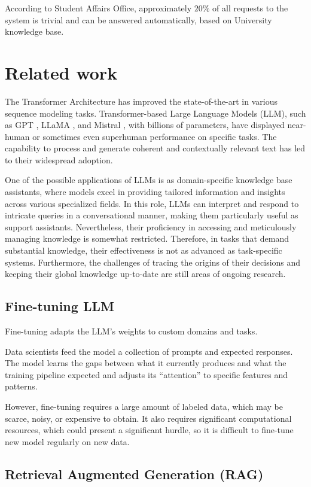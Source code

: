 \documentclass[conference, 11pt]{IEEEtran}
\begin{document}
According to Student Affairs Office, approximately $20\%$ of all requests to the system is trivial and can be answered automatically, based on University knowledge base.

\section{Related work}
The Transformer Architecture \cite{attention_is_all_you_need} has improved the state-of-the-art in various sequence modeling tasks. Transformer-based Large Language Models (LLM), such as GPT \cite{gpt}, LLaMA \cite{llama}, and Mistral \cite{mistral}, with billions of parameters, have displayed near-human or sometimes even superhuman performance on specific tasks. The capability to process and generate coherent and contextually relevant text has led to their widespread adoption.

One of the possible applications of LLMs is as domain-specific knowledge base assistants, where models excel in providing tailored information and insights across various specialized fields. In this role, LLMs can interpret and respond to intricate queries in a conversational manner, making them particularly useful as support assistants. Nevertheless, their proficiency in accessing and meticulously managing knowledge is somewhat restricted. Therefore, in tasks that demand substantial knowledge, their effectiveness is not as advanced as task-specific systems. Furthermore, the challenges of tracing the origins of their decisions and keeping their global knowledge up-to-date are still areas of ongoing research.

\subsection{Fine-tuning LLM}
Fine-tuning adapts the LLM's weights to custom domains and tasks.

Data scientists feed the model a collection of prompts and expected responses. The model learns the gaps between what it currently produces and what the training pipeline expected and adjusts its ``attention'' to specific features and patterns.

However, fine-tuning requires a large amount of labeled data, which may be scarce, noisy, or expensive to obtain. It also requires significant computational resources, which could present a significant hurdle, so it is difficult to fine-tune new model regularly on new data.

\subsection{Retrieval Augmented Generation (RAG)}
\end{document}
